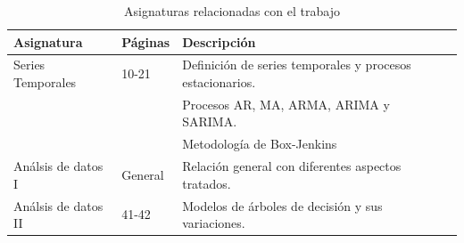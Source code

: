 \documentclass[12pt,twoside]{article}
\begin{document}
\begin{table}[ht] 
\centering
\begin{tabular}{llll} 
  \hline
 Asignatura & Páginas & Descripción  \\ 
  \hline
Series Temporales   & 10-21 & Definición de series temporales y procesos estacionarios. \\
& & Procesos AR, MA, ARMA, ARIMA y SARIMA. \\
& & Metodología de Box-Jenkins  \\
Análsis de datos I  & General & Relación general con diferentes aspectos tratados. \\ 
Análsis de datos II & 41-42 & Modelos de árboles de decisión y sus variaciones. \\ 
\hline
\end{tabular}
\caption{Asignaturas relacionadas con el trabajo} \label{tab{03}}
\end{table}
\end{document}
